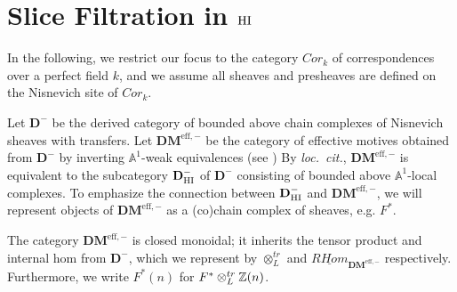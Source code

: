 




\newcommand{\D}{\mathbf{D}}
\newcommand{\DM}{\mathbf{DM}^{\mathrm{eff}}}
\newcommand{\DMm}{\mathbf{DM}^{\mathrm{eff},-}}
\newcommand{\A}{\mathbb{A}^1}
\newcommand{\Gm}{\mathbb{A}^1 \setminus \{0\}}
\newcommand{\tDM}{\otimes_{L}^{tr}}
\newcommand{\homDM}{\mathrm{Hom}_{\DMm}}
\newcommand{\rhomDM}{\underline{RHom}_{\DMm}}
\newcommand{\rhom}{\underline{RHom}_{\D^-}}
\renewcommand{\H}{\mathbf{H}}
\newcommand{\tHI}{\otimes^{\mathrm{Htr}}}
\newcommand{\homHI}{\mathrm{Hom}_{\HI}}
\newcommand{\ihomHI}{\underline{Hom}_{\HI}}
\newcommand{\Ox}{\mathcal{O}^{\times}}
\newcommand{\slice}[1]{\nu^{#1}}
\newcommand{\anis}{a_{\mathrm{Nis}}}
\newcommand{\sliceHI}{\sigma}
\newcommand{\SliceHI}{\Sigma}

\section{Slice Filtration in $\mathrm{HI}$}

\noindent In the following, we restrict our focus to the category 
$Cor_k$ of correspondences over a perfect field $k$, and we assume 
all sheaves and presheaves are defined on the Nisnevich site of 
$Cor_k$.

Let $\D^-$ be the derived category of bounded above chain 
complexes of Nisnevich sheaves with transfers. Let $\DMm$ be
the category of effective motives obtained from $\D^-$ by 
inverting $\A$-weak equivalences (see \cite{MVW}) By \emph{loc.\ cit.}, $\DMm$ is 
equivalent to the subcategory $\D_{\HI}^-$ of $\D^-$ consisting of 
bounded above $\A$-local complexes. To emphasize the connection
between $\D_{\HI}^-$ and $\DMm$, we will represent objects of
$\DMm$ as a (co)chain complex of sheaves, e.g. $F^*$.

The category $\DMm$ is closed monoidal; it inherits the tensor
product and internal hom from $\D^-$, which we represent by
$\tDM$ and $\rhomDM$ respectively. Furthermore, we write $F^*(n)$ for
$F^* \tDM \Z(n)$.

